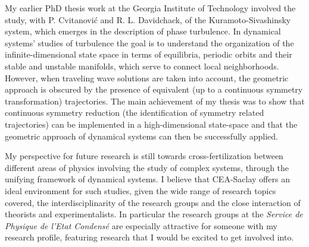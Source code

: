 \documentclass[a4paper,10pt]{article}
\begin{document}
My earlier PhD thesis work at the Georgia Institute of Technology
involved the study, with P. Cvitanovi\'c and R. L. Davidchack, 
of the Kuramoto-Sivashinsky system, which emerges in the description
of phase turbulence.
In dynamical systems' studies of turbulence the goal is to understand
the organization of the infinite-dimensional state space 
in terms of equilibria, periodic orbits and their
stable and unstable manifolds, which serve to connect local neighborhoods.
However, when traveling wave solutions are taken into account, the geometric
approach is obscured by the presence of equivalent (up to a continuous symmetry
transformation) trajectories. The main achievement of my
thesis was to show that continuous symmetry
reduction (the identification of symmetry related trajectories) can be
implemented in a high-dimensional state-space and that the
geometric approach of dynamical systems can then be successfully applied.

My perspective for future research is still towards cross-fertilization
between different areas of physics involving the study of complex systems, 
through the unifying framework of dynamical systems. I believe that
CEA-Saclay offers an ideal environment for such studies, given the wide
range of research topics covered, the interdisciplinarity of the research groups
and the close interaction of theorists and experimentalists. In particular
the research groups at the \textit{Service de Physique de l'Etat Condens\'{e}} are
especially attractive for someone with my research profile, featuring research
that I would be excited to get involved into.



% 
% 
\end{document}
